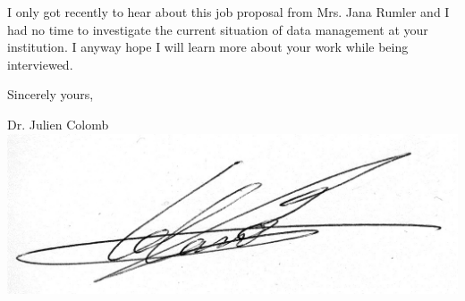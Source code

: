 I only got recently to hear about this job proposal from Mrs. Jana Rumler and I had no time to investigate the current situation of data management at your institution. I anyway hope I will learn more about your work while being interviewed.
 
Sincerely yours,\\

\hspace*{0.5\linewidth}
\begin{minipage}{0.3\linewidth}

Dr. Julien Colomb\\
\includegraphics[height=2\baselineskip]{Figures/signature.jpg}
\end{minipage}





